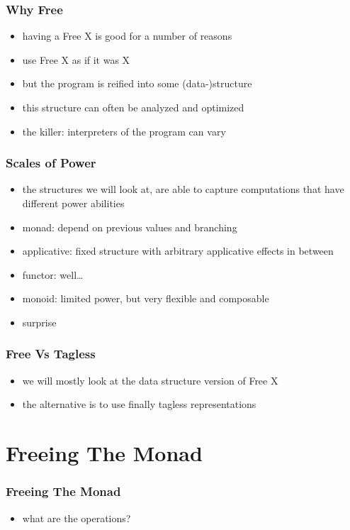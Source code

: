 \documentclass{beamer}
\begin{document}
\begin{frame}
  \frametitle{Why Free}
  \begin{itemize}
  \item having a Free X is good for a number of reasons
  \item use Free X as if it was X
  \item but the program is reified into some (data-)structure
  \item this structure can often be analyzed and optimized
  \item the killer: interpreters of the program can vary
  \end{itemize}
\end{frame}

\begin{frame}
  \frametitle{Scales of Power}
  \begin{itemize}
  \item the structures we will look at, are able to capture computations that have different power abilities
  \item monad: depend on previous values and branching
  \item applicative: fixed structure with arbitrary applicative effects in between
  \item functor: well\ldots
  \item monoid: limited power, but very flexible and composable
  \item surprise
  \end{itemize}
\end{frame}

\begin{frame}
  \frametitle{Free Vs Tagless}
  \begin{itemize}
  \item we will mostly look at the data structure version of Free X
  \item the alternative is to use finally tagless representations
  \end{itemize}
\end{frame}

\section{Freeing The Monad}\label{sec:free-monad}
\begin{frame}[fragile]
  \frametitle{Freeing The Monad}
  \begin{itemize}
  \item what are the operations?
  \end{itemize}
  \begin{center}
    \inputminted{scala}{snippets/monad-typeclass.scala}
  \end{center}
\end{frame}
\end{document}
